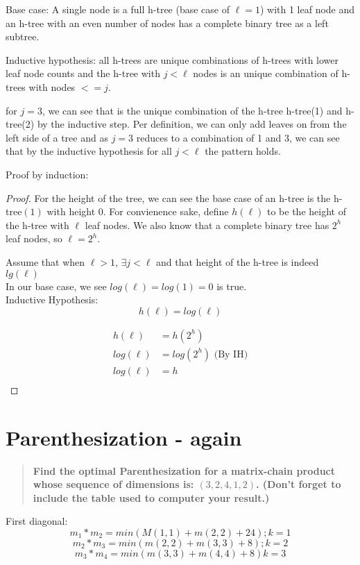 \documentclass[titlepage]{article}\usepackage[]{graphicx}\usepackage[]{color}
\begin{document}
Base case: A single node is a full h-tree (base case of $\ell = 1 $) with 1
leaf node and an h-tree with an even number of nodes has a complete binary tree
as a left subtree. 

Inductive hypothesis: all h-trees are unique combinations of h-trees with lower
leaf node counts and the h-tree with $j<\ell$ nodes is an unique combination of
h-trees with nodes $<=j$. 

for $j = 3$, we can see that is the unique combination of the h-tree h-tree(1)
and h-tree(2) by the inductive step. Per definition, we can only add leaves on
from the left side of a tree and as $j=3 $ reduces to a combination of 1 and 3,
we can see that by the inductive hypothesis for all $j < \ell$ the pattern
holds.


Proof by induction:
\begin{proof}
For the height of the tree, we can see the base case of an h-tree is the
h-tree$(1)$ with height 0. For convienence sake, define $h(\ell)$ to be
the height of the h-tree with $\ell$ leaf nodes. We also know that a complete
binary tree has $2^h$ leaf nodes, so $\ell = 2^h$. 

Assume that when $\ell > 1$,  $ \exists j < \ell $ and that height of the h-tree is
indeed $lg(\ell)$\\
In our base case, we see $log(\ell) = log(1) = 0$ is true. \\
Inductive Hypothesis: \[ h(\ell) = log(\ell) \]

\begin{align*}
  h(\ell) &= h(2^h) \\
  log(\ell) &= log(2^h) \text{ (By IH)} \\ 
  log(\ell) &= h \\
\end{align*}
\end{proof}



\section{Parenthesization - again }
\begin{quote}
 \textbf{ Find the optimal Parenthesization for a matrix-chain product whose sequence
  of dimensions is: $(3,2,4,1,2)$. (Don't forget to include the table used to
computer your result.)}
\end{quote}

First diagonal:
\[ m_1 * m_2 = min \left( M(1,1) + m(2,2) + 24\right); k=1 \]
\[ m_2 * m_3 = min \left( m(2,2) + m(3,3) + 8 \right); k=2 \]
\[ m_3 * m_4 = min \left( m(3,3) + m(4,4) + 8 \right) k =3 \]
\end{document}
